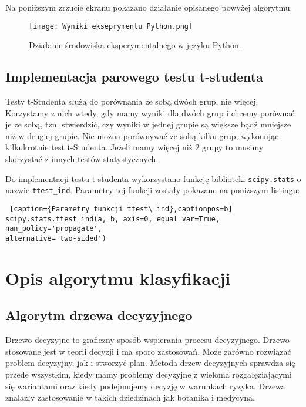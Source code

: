 \documentclass{article}
\begin{document}
\newpage

Na poniższym zrzucie ekranu pokazano działanie opisanego powyżej algorytmu.
\begin{figure}[ht]
    \centering
    \noindent 
    \vspace{.2cm}
    \texttt{[image: Wyniki ekseprymentu Python.png]}
    \caption{Działanie środowiska eksperymentalnego w języku Python.}
    \label{fig:aplikacja}
\end{figure}

\subsection{Implementacja parowego testu t-studenta}
\quad Testy t-Studenta służą do porównania ze sobą dwóch grup, nie więcej. Korzystamy z nich wtedy, gdy mamy wyniki dla dwóch grup i chcemy porównać je ze sobą, tzn. stwierdzić, czy wyniki w jednej grupie są większe bądź mniejsze niż w drugiej grupie. Nie można porównywać ze sobą kilku grup, wykonując kilkukrotnie test t-Studenta. Jeżeli mamy więcej niż 2 grupy to musimy skorzystać z innych testów statystycznych.

Do implementacji testu t-studenta wykorzystano funkcję biblioteki \texttt{scipy.stats} o nazwie \texttt{ttest\_ind}. Parametry tej funkcji zostały pokazane na poniższym listingu:\\

\begin{lstlisting} [caption={Parametry funkcji ttest\_ind},captionpos=b]
scipy.stats.ttest_ind(a, b, axis=0, equal_var=True, nan_policy='propagate',
alternative='two-sided')
\end{lstlisting}

\newpage

\section{Opis algorytmu klasyfikacji}
\subsection{Algorytm drzewa decyzyjnego}
\quad Drzewo decyzyjne to graficzny sposób wspierania procesu decyzyjnego. Drzewo stosowane jest w teorii decyzji i ma sporo zastosowań. Może zarówno rozwiązać problem decyzyjny, jak i stworzyć plan. Metoda drzew decyzyjnych sprawdza się przede wszystkim, kiedy mamy problemy decyzyjne z wieloma rozgałęziającymi się wariantami oraz kiedy podejmujemy decyzję w warunkach ryzyka. Drzewa znalazły zastosowanie w takich dziedzinach jak botanika i medycyna.
\end{document}

